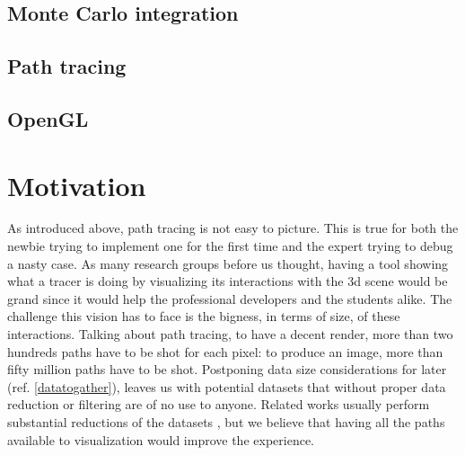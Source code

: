 \subsection{Monte Carlo integration}

\subsection{Path tracing}

\subsection{OpenGL}


\section{Motivation}
\label{motivation}

As introduced above, path tracing is not easy to picture. This is true for both the newbie trying to implement one for the first time and the expert trying to debug a nasty case. As many research groups before us thought, having a tool showing what a tracer is doing by visualizing its interactions with the 3d scene would be grand since it would help the professional developers and the students alike. The challenge this vision has to face is the bigness, in terms of size, of these interactions. Talking about path tracing, to have a decent render, more than two hundreds paths have to be shot for each pixel: to produce an image, more than fifty million paths have to be shot. Postponing data size considerations for later (ref. \ref{datatogather}), leaves us with potential datasets that without proper data reduction or filtering are of no use to anyone. Related works usually perform substantial reductions of the datasets \cite{simons2019applying}\cite{EMCA@2019}, but we believe that having all the paths available to visualization would improve the experience.

